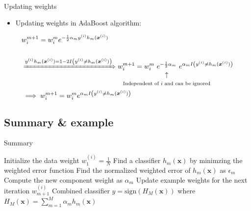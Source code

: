 \documentclass[serif, aspectratio=169]{beamer}
\makeatletter
\newcommand\vertarrowbox[3][6ex]{%
  \begin{array}[t]{@{}c@{}} #2 \\
  \left\uparrow\vcenter{\hrule height #1}\right.\kern-\nulldelimiterspace\\
  \makebox[0pt]{\scriptsize#3}
  \end{array}%
}
\makeatother
\begin{document}
\begin{frame}{Updating weights}
    \begin{itemize}
        \itemsep1em
        \justifying
        \item Updating weights in AdaBoost algorithm:
    \end{itemize}
    \begin{align*}
        &w_i^{m+1} = w_i^m e^{-\frac{1}{2}\alpha_my^{(i)}h_m(\boldsymbol{x}^{(i)})} \\ \\
        &\xRightarrow{y^{(i)}h_m(\boldsymbol{x}^{(i)}) = 1 - 2I\left(y^{(i)} \neq h_m(\boldsymbol{x}^{(i)})\right)} w_i^{m+1} = w_i^m
        \text{\vertarrowbox[0ex]{\ e^{-\frac{1}{2}\alpha_m}\ }{Independent of $i$ and can be ignored}}
        e^{\alpha_mI\left(y^{(i)} \neq h_m(\boldsymbol{x}^{(i)})\right)} \\
        &\implies w_i^{m+1}=w_i^{m}e^{\alpha_m I\left(y^{(i)} \neq h_m(\boldsymbol{x}^{(i)})\right)}
    \end{align*}
\end{frame}

\subsection{Summary \& example}

\begin{frame}{Summary}
    \begin{algorithm}[H]
    \caption{AdaBoost Summary}\label{alg:AdaBoostSummary}
    \begin{algorithmic}[1]
        \State Initialize the data weight $w_1^{(i)} = \frac{1}{N}$
    \EndFor
        \State Find a classifier $h_m(\boldsymbol{x})$ by minimzing the weighted error function
        \State Find the normalized weighted error of $h_m(\boldsymbol{x})$ as $\epsilon_m$
        \State Compute the new component weight as $\alpha_m$
        \State Update example weights for the next iteration $w_{m+1}^{(i)}$
    \EndFor
    \State Combined classifier $\hat{y}=\text{sign}(H_M(\boldsymbol{x}))$ where $H_M(\boldsymbol{x}) = \sum_{m=1}^M \alpha_m h_m(\boldsymbol{x})$
    \end{algorithmic}
    \end{algorithm}
\end{frame}
\end{document}
